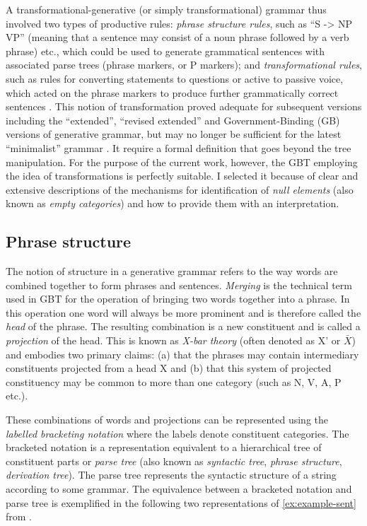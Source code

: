 A transformational-generative (or simply transformational) grammar thus involved two types of productive rules: \textit{phrase structure rules}, such as ``S -> NP VP'' (meaning that a sentence may consist of a noun phrase followed by a verb phrase) etc., which could be used to generate grammatical sentences with associated parse trees (phrase markers, or P markers); and \textit{transformational rules}, such as rules for converting statements to questions or active to passive voice, which acted on the phrase markers to produce further grammatically correct sentences \citep[59-66]{Bach1966}. This notion of transformation proved adequate for subsequent versions including the ``extended'', ``revised extended'' and Government-Binding (GB) versions of generative grammar, but may no longer be sufficient for the latest ``minimalist'' grammar \citep{Chomsky93}. It require a formal definition that goes beyond the tree manipulation. For the purpose of the current work, however, the GBT employing the idea of transformations is perfectly suitable. I selected it because of clear and extensive descriptions of the mechanisms for identification of \textit{null elements} (also known as \textit{empty categories}) and how to provide them with an interpretation. 

\subsection{Phrase structure}
The notion of structure in a generative grammar refers to the way words are combined together to form phrases and sentences. \textit{Merging} is the technical term used in GBT for the operation of bringing two words together into a phrase. In this operation one word will always be more prominent and is therefore called the \textit{head} of the phrase. The resulting combination is a new constituent and is called a \textit{projection} of the head. This is known as \textit{X-bar theory} (often denoted as X' or $\bar{X}$) and embodies two primary claims: (a) that the phrases may contain intermediary constituents projected from a head X and (b) that this system of projected constituency may be common to more than one category (such as N, V, A, P etc.).

These combinations of words and projections can be represented using the \textit{labelled bracketing notation} where the labels denote constituent categories. The bracketed notation is a representation equivalent to a hierarchical tree of constituent parts or \textit{parse tree} (also known as \textit{syntactic tree}, \textit{phrase structure}, \textit{derivation tree}). The parse tree represents the syntactic structure of a string according to some grammar. The equivalence between a bracketed notation and parse tree is exemplified in the following two representations of \ref{ex:example-sent} from \citep[83]{Haegeman1991}.

